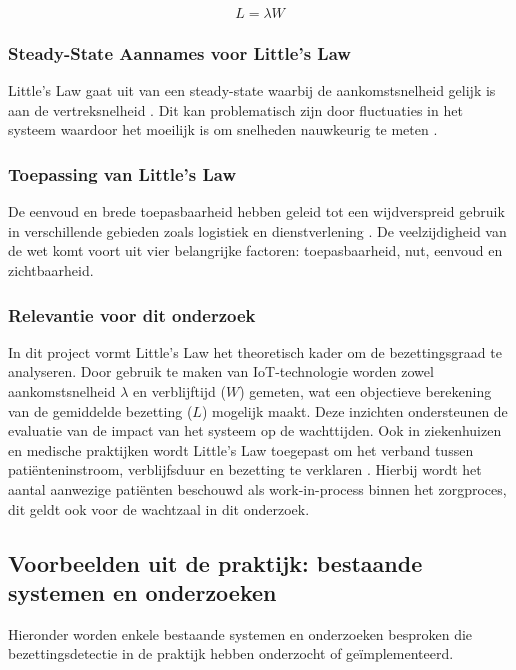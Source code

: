 \[
L = \lambda W
\]

\subsubsection{Steady-State Aannames voor Little's Law}
Little's Law gaat uit van een steady-state \autocite{Walsh2007} waarbij de aankomstsnelheid gelijk is aan de vertreksnelheid \autocite{Marks2019}. Dit kan problematisch zijn door fluctuaties in het systeem \autocite{Walsh2007} waardoor het moeilijk is om snelheden nauwkeurig te meten \autocite{Hayati2017}.

\subsubsection{Toepassing van Little’s Law}
De eenvoud en brede toepasbaarheid hebben geleid tot een wijdverspreid gebruik in verschillende gebieden zoals logistiek en dienstverlening \autocite{SimchiLevi2011}. De veelzijdigheid van de wet komt voort uit vier belangrijke factoren: toepasbaarheid, nut, eenvoud en zichtbaarheid. \autocite{Potter2020}

\subsubsection{Relevantie voor dit onderzoek}
In dit project vormt Little’s Law het theoretisch kader om de bezettingsgraad te analyseren. Door gebruik te maken van IoT-technologie worden zowel aankomstsnelheid \( \lambda \) en verblijftijd (\(W\)) gemeten, wat een objectieve berekening van de gemiddelde bezetting (\(L\)) mogelijk maakt. Deze inzichten ondersteunen de evaluatie van de impact van het systeem op de wachttijden. Ook in ziekenhuizen en medische praktijken wordt Little’s Law toegepast om het verband tussen patiënteninstroom, verblijfsduur en bezetting te verklaren \autocite{Aahlin2022}. Hierbij wordt het aantal aanwezige patiënten beschouwd als work-in-process binnen het zorgproces, dit geldt ook voor de wachtzaal in dit onderzoek.

\subsection{Voorbeelden uit de praktijk: bestaande systemen en onderzoeken}
Hieronder worden enkele bestaande systemen en onderzoeken besproken die bezettingsdetectie in de praktijk hebben onderzocht of geïmplementeerd.

